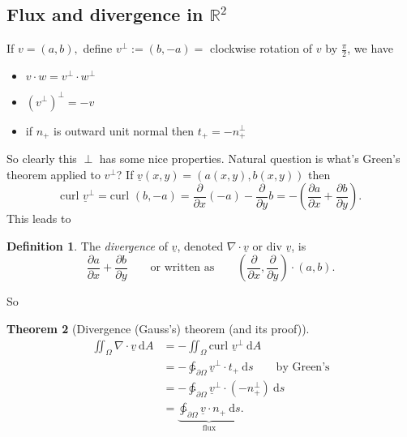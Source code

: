 \documentclass[a4paper]{article}
\theoremstyle{definition}
\newcommand{\curl}{\text{curl }}
\newtheorem{defn}{Definition}[subsection]
\newtheorem{thm}[defn]{Theorem}
\begin{document}
\subsection{Flux and divergence in $\mathbb R^2$}
If $v=(a,b),$ define $v^\perp := (b,-a)=$ clockwise rotation of $v$ by $\frac{\pi}{2}$, we have
\begin{itemize}
    \item $v\cdot w = v^\perp \cdot w^\perp$
    \item $\left(v^\perp\right)^\perp = -v$
    \item if $n_+$ is outward unit normal then $t_+ = -n_+^\perp$
\end{itemize}
So clearly this $\perp$ has some nice properties. Natural question is what's Green's theorem applied to $v^\perp$? If $\underline v (x,y) = (a(x,y),b(x,y))$ then
\[
\curl \underline v^\perp =\curl (b,-a) = \frac{\partial}{\partial x} (-a) - \frac{\partial}{\partial y} b = -\left( \frac{\partial a}{\partial x}+\frac{\partial b}{\partial y}\right).
\]
This leads to
\begin{defn}
The \textit{divergence} of $\underline v$, denoted $\nabla \cdot \underline v$ or $\text{div } \underline v$, is
\[
\frac{\partial a}{\partial x}+\frac{\partial b}{\partial y} \qquad \text{or written as} \qquad \left( \frac{\partial}{\partial x},\frac{\partial}{\partial y} \right) \cdot (a,b).
\]
\end{defn}
So
\begin{thm}[Divergence (Gauss's) theorem (and its proof)]
\[
\begin{aligned}
\iint_\Omega \nabla \cdot \underline v \ \mathrm d A &= -\iint_\Omega \curl \underline v^\perp \ \mathrm d A \\&= -\ointctrclockwise_{\partial \Omega} \underline v^\perp \cdot t_+ \ \mathrm d s \qquad \text{by Green's} \\&=-\ointctrclockwise_{\partial \Omega} \underline v^\perp \cdot (-n_+^\perp) \ \mathrm d s \\&= \underbrace{\ointctrclockwise_{\partial \Omega} \underline v\cdot n_+ \ \mathrm d s}_{\text{flux}} .
\end{aligned}
\]
\end{thm}
\end{document}
